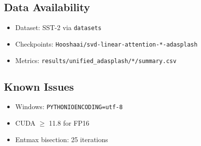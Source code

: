 \subsection{Data Availability}

\begin{itemize}
\item Dataset: SST-2 via \texttt{datasets}
\item Checkpoints: \texttt{Hooshaai/svd-linear-attention-*-adasplash}
\item Metrics: \texttt{results/unified\_adasplash/*/summary.csv}

\end{itemize}
\subsection{Known Issues}

\begin{itemize}
\item Windows: \texttt{PYTHONIOENCODING=utf-8}
\item CUDA $\ge$ 11.8 for FP16
\item Entmax bisection: 25 iterations
\end{itemize}
